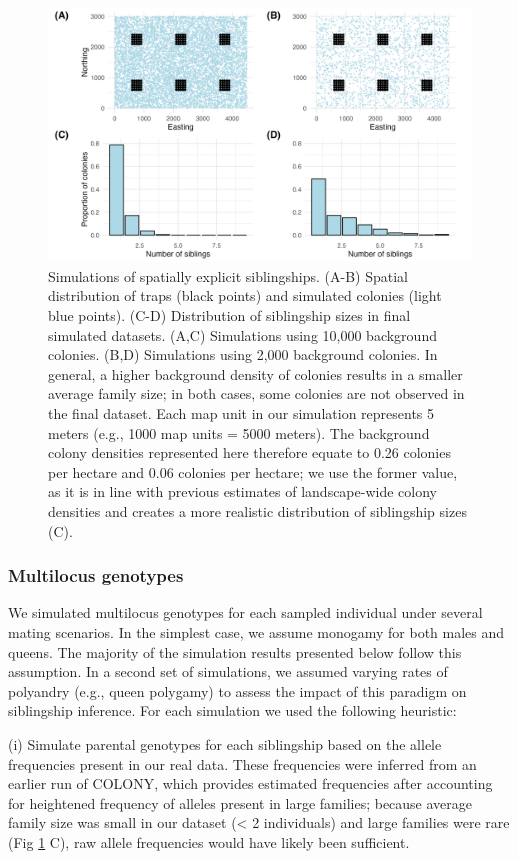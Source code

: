 \documentclass[12pt]{article}
\begin{document}
\begin{figure}[H]
    \centering
    \includegraphics[width=\linewidth]{appendix_figures/simulations.jpg}
    \caption{Simulations of spatially explicit siblingships. (A-B) Spatial distribution of traps (black points) and simulated colonies (light blue points). (C-D) Distribution of siblingship sizes in final simulated datasets. (A,C) Simulations using 10,000 background colonies. (B,D) Simulations using 2,000 background colonies. In general, a higher background density of colonies results in a smaller average family size; in both cases, some colonies are not observed in the final dataset. Each map unit in our simulation represents 5 meters (e.g., 1000 map units = 5000 meters). The background colony densities represented here therefore equate to 0.26 colonies per hectare and 0.06 colonies per hectare; we use the former value, as it is in line with previous estimates of landscape-wide colony densities and creates a more realistic distribution of siblingship sizes (C).}
    \label{fig:simulations}
\end{figure}


\subsubsection{Multilocus genotypes}
We simulated multilocus genotypes for each sampled individual under several mating scenarios. In the simplest case, we assume monogamy for both males and queens. The majority of the simulation results presented below follow this assumption. In a second set of simulations, we assumed varying rates of polyandry (e.g., queen polygamy) to assess the impact of this paradigm on siblingship inference. For each simulation we used the following heuristic:

(i) Simulate parental genotypes for each siblingship based on the allele frequencies present in our real data. These frequencies were inferred from an earlier run of COLONY, which provides estimated frequencies after accounting for heightened frequency of alleles present in large families; because average family size was small in our dataset (< 2 individuals) and large families were rare (Fig \ref{fig:simulations} C), raw allele frequencies would have likely been sufficient.
\end{document}
